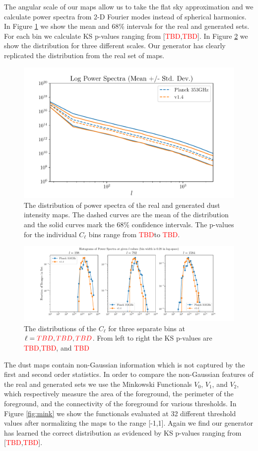 \documentclass[twocolumn]{aastex62}
\def\tbd{\textcolor{red}{TBD}}
\begin{document}
The angular scale of our maps allow us to take the flat sky approximation and we calculate power spectra from 2-D Fourier modes instead of spherical harmonics. In Figure \ref{fig:power} we show the mean and 68\% intervals for the real and generated sets. For  each bin we calculate KS p-values ranging from [\tbd,\tbd]. In Figure \ref{fig:powerhist} we show the distribution for three different  scales. Our generator has clearly replicated the distribution from the real set of maps.

\begin{figure}
\includegraphics[width = .5\textwidth]{LogPowerSpectra.pdf}
\caption{The distribution of power spectra of the real and generated dust intensity maps. The dashed curves are the mean of the distribution and the solid curves mark the 68\% confidence intervals. The p-values for the individual $C_{\ell}$ bins range from \tbd to \tbd. }
\label{fig:power}
\end{figure}

\begin{figure}[!tbh]
\includegraphics[width = \textwidth]{HistPowerSpectraSlices.pdf}
\caption{The distributions of the $C_{\ell}$ for three separate bins at $\ell=\tbd,\tbd,\tbd$. From left to right the KS p-values are \tbd,\tbd, and \tbd}
\label{fig:powerhist}
\end{figure}

The dust maps contain non-Gaussian information which is not captured by the first and second order statistics. In order to compare the non-Gaussian features of the real and generated sets we use the Minkowski Functionals $V_0$, $V_1$, and $V_2$, which respectively measure the area of the foreground, the perimeter of the foreground, and the connectivity of the foreground for various thresholds.  In Figure \ref{fig:mink} we show the functionals evaluated at 32 different threshold values after normalizing the maps to the range [-1,1]. Again we find our generator has learned the correct distribution as evidenced by KS p-values ranging from [\tbd,\tbd]. 
\end{document}
